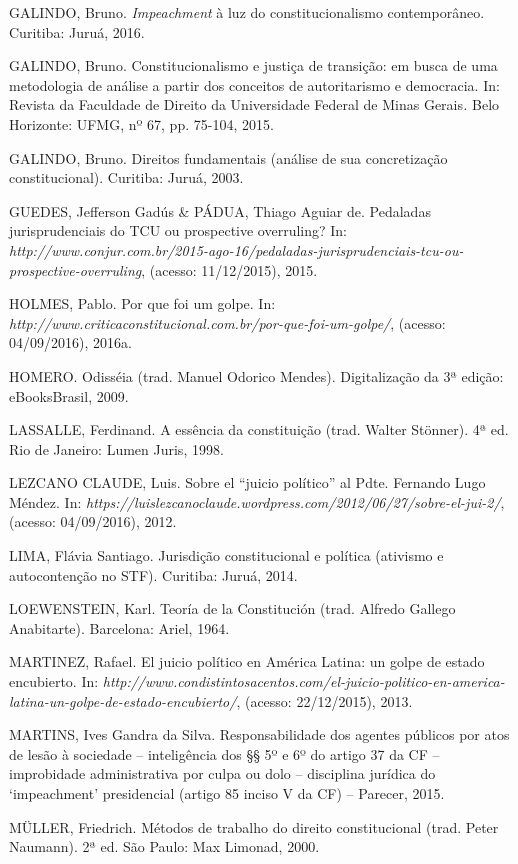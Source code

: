 GALINDO, Bruno. \emph{Impeachment} à luz do constitucionalismo
contemporâneo. Curitiba: Juruá, 2016.

GALINDO, Bruno. Constitucionalismo e justiça de transição: em busca de
uma metodologia de análise a partir dos conceitos de autoritarismo e
democracia. In: Revista da Faculdade de Direito da Universidade Federal
de Minas Gerais\emph{.} Belo Horizonte: UFMG, nº 67, pp. 75-104, 2015.

GALINDO, Bruno. Direitos fundamentais (análise de sua concretização
constitucional). Curitiba: Juruá, 2003.

GUEDES, Jefferson Gadús \& PÁDUA, Thiago Aguiar de. Pedaladas
jurisprudenciais do TCU ou prospective overruling? In:
\emph{http://www.conjur.com.br/2015-ago-16/pedaladas-jurisprudenciais-tcu-ou-prospective-overruling},
(acesso: 11/12/2015), 2015.

HOLMES, Pablo. Por que foi um golpe. In:
\emph{http://www.criticaconstitucional.com.br/por-que-foi-um-golpe/},
(acesso: 04/09/2016), 2016a.

HOMERO. Odisséia (trad. Manuel Odorico Mendes). Digitalização da 3ª
edição: eBooksBrasil, 2009.

LASSALLE, Ferdinand. A essência da constituição (trad. Walter Stönner).
4ª ed. Rio de Janeiro: Lumen Juris, 1998.

LEZCANO CLAUDE, Luis. Sobre el ``juicio político'' al Pdte. Fernando
Lugo Méndez. In:
\emph{https://luislezcanoclaude.wordpress.com/2012/06/27/sobre-el-jui-2/},
(acesso: 04/09/2016), 2012.

LIMA, Flávia Santiago. Jurisdição constitucional e política (ativismo e
autocontenção no STF). Curitiba: Juruá, 2014.

LOEWENSTEIN, Karl. Teoría de la Constitución (trad. Alfredo Gallego
Anabitarte). Barcelona: Ariel, 1964.

MARTINEZ, Rafael. El juicio político en América
Latina: un golpe de estado encubierto. In:
\emph{http://www.condistintosacentos.com/el-juicio-politico-en-america-latina-un-golpe-de-estado-encubierto/},
(acesso: 22/12/2015),
2013.

MARTINS, Ives Gandra da Silva. Responsabilidade dos agentes públicos por
atos de lesão à sociedade -- inteligência dos §§ 5º e 6º do artigo 37 da
CF -- improbidade administrativa por culpa ou dolo -- disciplina
jurídica do `impeachment' presidencial (artigo 85 inciso V da CF) --
Parecer, 2015.

MÜLLER, Friedrich. Métodos de trabalho do direito constitucional (trad.
Peter Naumann). 2ª ed. São Paulo: Max Limonad, 2000.

